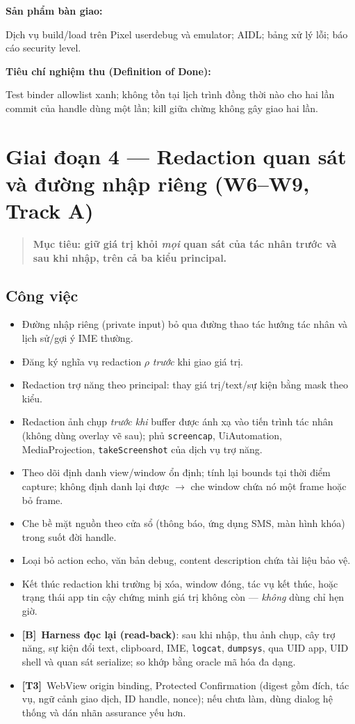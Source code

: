 \documentclass[11pt,a4paper]{article}
\newcommand{\code}[1]{\texttt{\small #1}}
\newcommand{\term}[1]{\textbf{#1}}
\newcommand{\Tthree}{\textbf{\color{shgray}[T3]}}
\newcommand{\trB}{\textbf{[B]}}
\newenvironment{phasebox}
  {\begin{quote}\color{shblue}\bfseries}
  {\end{quote}}
\newcommand{\dod}[1]{\par\vspace{0.3em}\noindent\textbf{\color{shgreen}Tiêu chí nghiệm thu (Definition of Done):}\par\vspace{0.2em}\noindent #1}
\newcommand{\deliverable}[1]{\par\vspace{0.3em}\noindent\textbf{\color{shblue}Sản phẩm bàn giao:}\par\vspace{0.2em}\noindent #1}
\begin{document}
\deliverable{Dịch vụ build/load trên Pixel userdebug và emulator; AIDL; bảng xử lý lỗi; báo cáo security level.}

\dod{Test binder allowlist xanh; không tồn tại lịch trình đồng thời nào cho hai lần commit của handle dùng một lần; kill giữa chừng không gây giao hai lần.}

\section{Giai đoạn 4 --- Redaction quan sát và đường nhập riêng (W6--W9, Track A)}

\begin{phasebox}Mục tiêu: giữ giá trị khỏi \emph{mọi} quan sát của tác nhân trước và sau khi nhập, trên cả ba kiểu principal.\end{phasebox}

\subsection{Công việc}

\begin{itemize}
  \item Đường nhập riêng (private input) bỏ qua đường thao tác hướng tác nhân và lịch sử/gợi ý IME thường.
  \item Đăng ký nghĩa vụ redaction $\rho$ \emph{trước} khi giao giá trị.
  \item Redaction trợ năng theo principal: thay giá trị/text/sự kiện bằng mask theo kiểu.
  \item Redaction ảnh chụp \emph{trước khi} buffer được ánh xạ vào tiến trình tác nhân (không dùng overlay vẽ sau); phủ \code{screencap}, UiAutomation,
        MediaProjection, \code{takeScreenshot} của dịch vụ trợ năng.
  \item Theo dõi định danh view/window ổn định; tính lại bounds tại thời điểm capture; không định danh lại được $\to$ che window chứa nó một frame hoặc bỏ frame.
  \item Che bề mặt nguồn theo cửa sổ (thông báo, ứng dụng SMS, màn hình khóa) trong suốt đời handle.
  \item Loại bỏ action echo, văn bản debug, content description chứa tài liệu bảo vệ.
  \item Kết thúc redaction khi trường bị xóa, window đóng, tác vụ kết thúc, hoặc trạng thái app tin cậy chứng minh giá trị không còn --- \emph{không} dùng chỉ hẹn giờ.
  \item \trB\ \term{Harness đọc lại (read-back)}: sau khi nhập, thu ảnh chụp, cây trợ năng, sự kiện đổi text, clipboard, IME, \code{logcat}, \code{dumpsys}, qua UID app, UID shell và quan sát serialize; so khớp bằng oracle mã hóa đa dạng.
  \item \Tthree\ WebView origin binding, Protected Confirmation (digest gồm đích, tác vụ, ngữ cảnh giao dịch, ID handle, nonce); nếu chưa làm, dùng dialog hệ thống và dán nhãn assurance yếu hơn.
\end{itemize}
\end{document}
